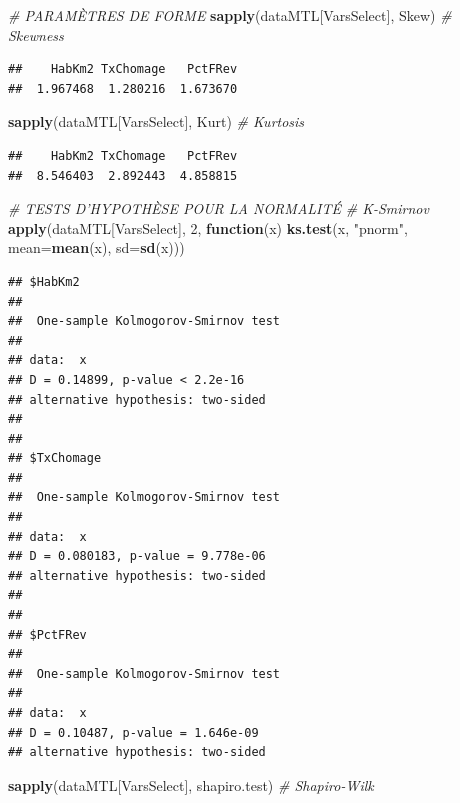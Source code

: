 \documentclass[
  11pt,
  french,
]{book}
\makeatletter
\newenvironment{Shaded}{\begin{snugshade}}{\end{snugshade}}
\newcommand{\CommentTok}[1]{\textcolor[rgb]{0.56,0.35,0.01}{\textit{#1}}}
\newcommand{\ControlFlowTok}[1]{\textcolor[rgb]{0.13,0.29,0.53}{\textbf{#1}}}
\newcommand{\DataTypeTok}[1]{\textcolor[rgb]{0.13,0.29,0.53}{#1}}
\newcommand{\DecValTok}[1]{\textcolor[rgb]{0.00,0.00,0.81}{#1}}
\newcommand{\KeywordTok}[1]{\textcolor[rgb]{0.13,0.29,0.53}{\textbf{#1}}}
\newcommand{\NormalTok}[1]{#1}
\newcommand{\StringTok}[1]{\textcolor[rgb]{0.31,0.60,0.02}{#1}}
\newenvironment{kframe}{%
\medskip{}
\setlength{\fboxsep}{.8em}
 \def\at@end@of@kframe{}%
 \ifinner\ifhmode%
  \def\at@end@of@kframe{\end{minipage}}%
  \begin{minipage}{\columnwidth}%
 \fi\fi%
 \def\FrameCommand##1{\hskip\@totalleftmargin \hskip-\fboxsep
 \colorbox{shadecolor}{##1}\hskip-\fboxsep
     \hskip-\linewidth \hskip-\@totalleftmargin \hskip\columnwidth}%
 \MakeFramed {\advance\hsize-\width
   \@totalleftmargin\z@ \linewidth\hsize
   \@setminipage}}%
 {\par\unskip\endMakeFramed%
 \at@end@of@kframe}
\renewenvironment{Shaded}{\begin{kframe}}{\end{kframe}}
\makeatother
\begin{document}
\begin{Shaded}
\begin{Highlighting}[]
\CommentTok{# PARAMÈTRES DE FORME}
\KeywordTok{sapply}\NormalTok{(dataMTL[VarsSelect], Skew)    }\CommentTok{# Skewness}
\end{Highlighting}
\end{Shaded}

\begin{verbatim}
##    HabKm2 TxChomage   PctFRev 
##  1.967468  1.280216  1.673670
\end{verbatim}

\begin{Shaded}
\begin{Highlighting}[]
\KeywordTok{sapply}\NormalTok{(dataMTL[VarsSelect], Kurt)    }\CommentTok{# Kurtosis}
\end{Highlighting}
\end{Shaded}

\begin{verbatim}
##    HabKm2 TxChomage   PctFRev 
##  8.546403  2.892443  4.858815
\end{verbatim}

\begin{Shaded}
\begin{Highlighting}[]
\CommentTok{# TESTS D'HYPOTHÈSE POUR LA NORMALITÉ}
\CommentTok{# K-Smirnov}
\KeywordTok{apply}\NormalTok{(dataMTL[VarsSelect], }\DecValTok{2}\NormalTok{, }\ControlFlowTok{function}\NormalTok{(x) }\KeywordTok{ks.test}\NormalTok{(x, }\StringTok{"pnorm"}\NormalTok{, }\DataTypeTok{mean=}\KeywordTok{mean}\NormalTok{(x), }\DataTypeTok{sd=}\KeywordTok{sd}\NormalTok{(x)))}
\end{Highlighting}
\end{Shaded}

\begin{verbatim}
## $HabKm2
## 
##  One-sample Kolmogorov-Smirnov test
## 
## data:  x
## D = 0.14899, p-value < 2.2e-16
## alternative hypothesis: two-sided
## 
## 
## $TxChomage
## 
##  One-sample Kolmogorov-Smirnov test
## 
## data:  x
## D = 0.080183, p-value = 9.778e-06
## alternative hypothesis: two-sided
## 
## 
## $PctFRev
## 
##  One-sample Kolmogorov-Smirnov test
## 
## data:  x
## D = 0.10487, p-value = 1.646e-09
## alternative hypothesis: two-sided
\end{verbatim}

\begin{Shaded}
\begin{Highlighting}[]
\KeywordTok{sapply}\NormalTok{(dataMTL[VarsSelect], shapiro.test)       }\CommentTok{# Shapiro-Wilk}
\end{Highlighting}
\end{Shaded}
\end{document}
